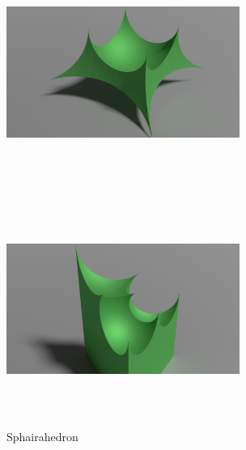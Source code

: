 \begin{figure}[htbp]
 \begin{minipage}{0.49\hsize}
  \center
  \includegraphics[width=3in, height=3in, keepaspectratio]{../img/klein/sphairahedron1.pdf}
  \subcaption{}
 \end{minipage}
 \hspace*{\fill}
 \begin{minipage}{0.49\hsize}
  \center
  \includegraphics[width=3in, height=3in, keepaspectratio]{../img/klein/sphairahedron2.pdf}
  \subcaption{}
 \end{minipage}
 \caption{Sphairahedron}
 \label{fig:sphairahedron}
\end{figure}

